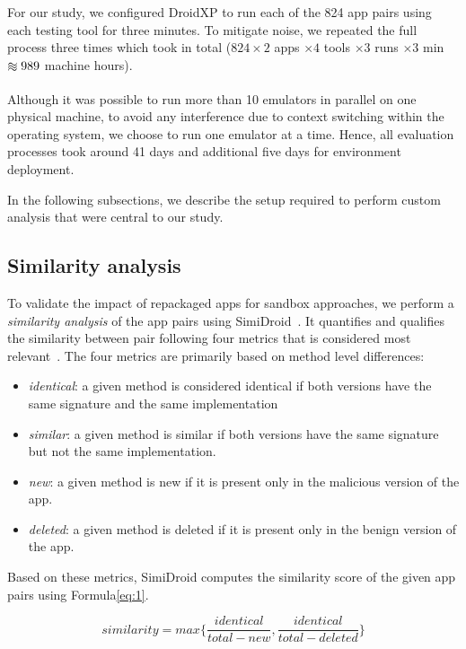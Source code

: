 For our study, we configured DroidXP to run each of the 824 app pairs using each testing tool for three minutes. To mitigate noise, we repeated the full process three times which took in total ($824 \times 2$ apps $\times 4$ tools $\times 3$ runs $\times 3$ min $\apeq 989$ machine hours).

Although it was possible to run more than 10 emulators in parallel on one physical machine, to avoid any interference due to context switching within the operating system, we choose to run one emulator at a time. Hence, all evaluation processes took around 41 days and additional five days for environment deployment.

In the following subsections, we describe the setup required to perform custom analysis that were central to our study. 
\subsection{Similarity analysis} \label{sec:similarity}

To validate the impact of repackaged apps for sandbox approaches, we perform a \textit{similarity analysis} of the app pairs using SimiDroid~\cite{DBLP:conf/trustcom/0029BK17}. It quantifies and qualifies the similarity between pair following four metrics that is considered most relevant~\cite{DBLP:conf/wcre/0029BKT16}. The four metrics are primarily based on method level differences:

\begin{itemize}
    \item \textit{identical}: a given method is considered identical if both versions have the same signature and the same implementation
    \item \textit{similar}: a given method is similar if both versions have the same signature but not the same implementation.
    \item \textit{new}: a given method is new if it is present only in the malicious version of the app.
    \item \textit{deleted}: a given method is deleted if it is present only in the benign version of the app.
\end{itemize}

Based on these metrics, SimiDroid computes the similarity score of the given app pairs using Formula\eqref{eq:1}.

\begin{equation}
 similarity = max \lbrace\frac{identical}{total-new},\frac{identical}{total-deleted}\rbrace  \label{eq:1}
\end{equation}

